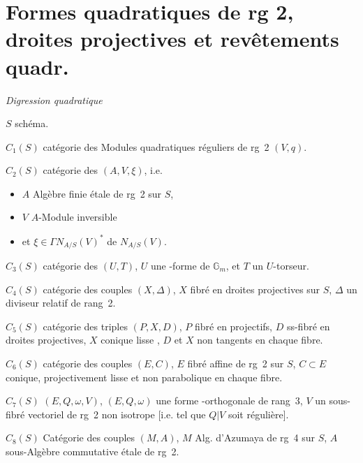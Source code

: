 \documentclass[11pt,a4paper]{article}
\begin{document}
\section{Formes quadratiques de rg 2, droites projectives et revêtements quadr.}


\emph{Digression quadratique}

$S$ schéma.

$C_1(S)$ catégorie des Modules quadratiques réguliers de rg~2 $(V, q)$.

$C_2(S)$ catégorie des  $(A, V, \xi)$, i.e.
\begin{itemize}
  \item $A$ Algèbre finie étale de rg~2 sur $S$,
  \item $V$ $A$-Module inversible
  \item et $\xi \in \Gamma N_{A/S}(V)^{*}$  de $N_{A/S}(V)$.
\end{itemize}

$C_3(S)$ catégorie des  \struck{\ill{}} $(U, T)$, $U$ une \uncertain{\struck{\ill{}}}-forme de $\mathbb{G}_m$, et $T$ \struck{\ill{}} un $U$-torseur.

$C_4(S)$ catégorie des couples $(X, \Delta)$, $X$ fibré en droites projectives sur $S$, $\Delta$ un diviseur relatif  de rang~2.

$C_5(S)$ catégorie des triples $(P, X, D)$, $P$ fibré en   projectifs, $D$  ss-fibré en droites projectives, $X$ conique lisse , $D$ et $X$ non tangents en chaque fibre.

$C_6(S)$ catégorie des couples $(E, C)$, $E$ fibré affine de rg~2 sur $S$, $C \subset E$ conique, projectivement lisse et  non parabolique en chaque fibre.

$C_7(S)$   $(E, Q, \omega, V)$, $(E, Q, \omega)$ une forme -orthogonale de rang~3, $V$ un sous- fibré vectoriel de rg~2  non isotrope [i.e. tel que $Q|V$ soit régulière].

$C_8(S)$ Catégorie des couples $(M, A)$, $M$ Alg. d'Azumaya de rg~4 sur $S$, $A$ sous-Algèbre commutative étale de rg~2.
\end{document}
